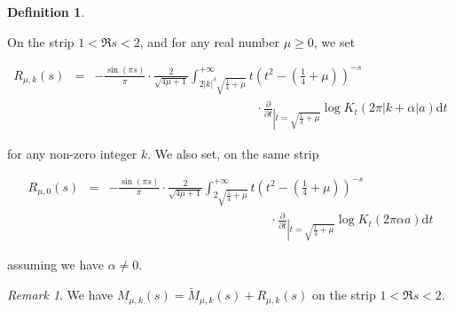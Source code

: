 \documentclass{jams-l}
\theoremstyle{definition}
\newtheorem{definition}[theorem]{Definition}
\theoremstyle{remark}
\newtheorem{remark}[theorem]{Remark}
\numberwithin{equation}{section}
\begin{document}
        \begin{definition}
        \label{DefRmuk}
                
            On the strip $1 < \Re s < 2$, and for any real number $\mu \geqslant 0$, we set
            
            \[ \begin{array}{lll}
                    R_{\mu,k} \left( s \right) & = & - \frac{\sin \left( \pi s \right)}{\pi} \cdot \frac{2}{\sqrt{4 \mu + 1}} \int_{2 \left \vert k \right \vert^{\delta} \sqrt{\frac{1}{4} + \mu}}^{+ \infty} t \left( t^2 - \left( \frac{1}{4} + \mu \right) \right)^{-s} \\[0.5em]
                    
                    && \qquad \qquad \qquad \qquad \qquad \qquad \quad \cdot \frac{\partial}{\partial t}_{\left \vert t = \sqrt{\frac{1}{4} + \mu} \right.} \log K_t \left( 2 \pi \left \vert k + \alpha \right \vert a \right) \mathrm{d}t
                \end{array} \]
            
            \noindent for any non-zero integer $k$. We also set, on the same strip
            
            \[ \begin{array}{lll}
                    R_{\mu,0} \left( s \right) & = & - \frac{\sin \left( \pi s \right)}{\pi} \cdot \frac{2}{\sqrt{4 \mu + 1}} \int_{2 \sqrt{\frac{1}{4} + \mu}}^{+ \infty} t \left( t^2 - \left( \frac{1}{4} + \mu \right) \right)^{-s} \\[0.5em]
                    
                    && \qquad \qquad \qquad \qquad \qquad \qquad \quad \cdot \frac{\partial}{\partial t}_{\left \vert t = \sqrt{\frac{1}{4} + \mu} \right.} \log K_t \left( 2 \pi \alpha a \right) \mathrm{d}t
                \end{array} \]
            
            \noindent assuming we have $\alpha \neq 0$.
                
        \end{definition}
        
        \begin{remark}
        
            We have $M_{\mu,k} \left( s \right) = \widetilde{M}_{\mu,k} \left( s \right) + R_{\mu,k} \left( s \right)$ on the strip $1 < \Re s < 2$.
        
        \end{remark}
\end{document}

